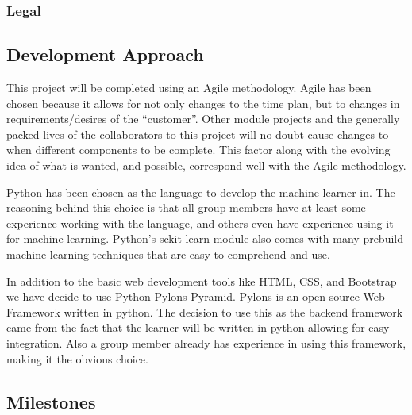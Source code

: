 \documentclass[11pt]{article} %
\numberwithin{equation}{section}
\begin{document}
\subsubsection{Legal}

\subsection{Development Approach}
\quad This project will be completed using an Agile methodology. Agile has been chosen because it allows for not only changes to the time plan, but to changes in requirements/desires of the “customer”. Other module projects and the generally packed lives of the collaborators to this project will no doubt cause changes to when different components to be complete. This factor along with the evolving idea of what is wanted, and possible, correspond well with the Agile methodology.\par

\quad Python has been chosen as the language to develop the machine learner in. The reasoning behind this choice is that all group members have at least some experience working with the language, and others even have experience using it for machine learning. Python’s sckit-learn module also comes with many prebuild machine learning techniques that are easy to comprehend and use.\par

\quad In addition to the basic web development tools like HTML, CSS, and Bootstrap we have decide to use Python Pylons Pyramid. Pylons is an open source Web Framework written in python. The decision to use this as the backend framework came from the fact that the learner will be written in python allowing for easy integration. Also a group member already has experience in using this framework, making it the obvious choice.\par

\subsection{Milestones}
\end{document}
